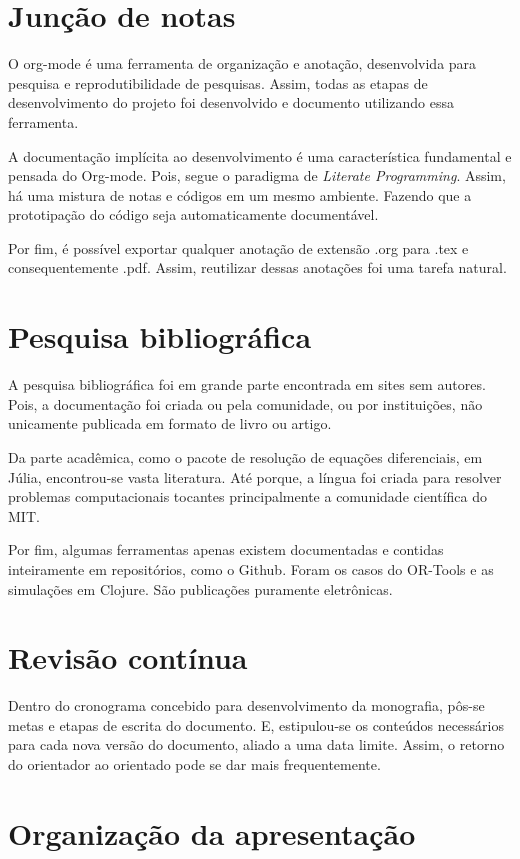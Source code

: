 \documentclass[
12pt,				%
openright,			%
oneside,			%
a4paper,			%
english,			%
french,				%
spanish,			%
brazil,				%
]{abntex2}
\begin{document}
\section{Junção de notas}
O org-mode é uma ferramenta de organização e anotação, desenvolvida
para pesquisa e reprodutibilidade de pesquisas. Assim, todas as etapas
de desenvolvimento do projeto foi desenvolvido e documento utilizando
essa ferramenta.

A documentação implícita ao desenvolvimento é uma
característica fundamental e pensada do Org-mode. Pois, segue o
paradigma de \textit{Literate Programming}. Assim, há uma mistura de
notas e códigos em um mesmo ambiente. Fazendo que a prototipação do
código seja automaticamente documentável.

Por fim, é possível exportar qualquer anotação de extensão .org para
.tex e consequentemente .pdf. Assim, reutilizar dessas anotações foi
uma tarefa natural.

\section{Pesquisa bibliográfica}
A pesquisa bibliográfica foi em grande parte encontrada em sites sem
autores. Pois, a documentação foi criada ou pela comunidade, ou por
instituições, não unicamente publicada em formato de livro ou artigo.

Da parte acadêmica, como o pacote de resolução de equações
diferenciais, em Júlia, encontrou-se vasta literatura. Até porque, a
língua foi criada para resolver problemas computacionais tocantes
principalmente a comunidade científica do MIT.

Por fim, algumas ferramentas apenas existem documentadas e contidas
inteiramente em repositórios, como o Github. Foram os casos do
OR-Tools e as simulações em Clojure. São publicações puramente eletrônicas.

\section{Revisão contínua}

Dentro do cronograma concebido para desenvolvimento da monografia,
pôs-se metas e etapas de escrita do documento. E, estipulou-se os
conteúdos necessários para cada nova versão do documento, aliado a uma
data limite. Assim, o retorno do orientador ao orientado pode se dar
mais frequentemente.

\section{Organização da apresentação}
\end{document}
